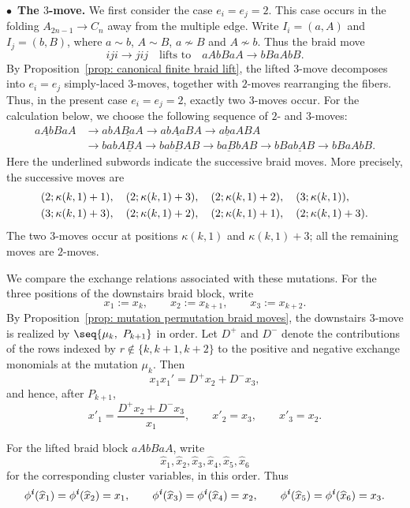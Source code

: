 \documentclass[12pt, leqno]{amsart}
\numberwithin{equation}{section}
\theoremstyle{plain}
\theoremstyle{definition}
\newcommand{\seteq}{\mathbin{:=}}
\newcommand{\ii}{ \textbf{\textit{i}}}
\newcommand{\hx}{\widehat{x}}
\begin{document}
\smallskip
\noindent
$\bullet$\ \textbf{The $3$-move.}
We first consider the case $e_i=e_j=2$.  This case occurs in the folding
$A_{2n-1}\to C_n$ away from the multiple edge.
Write $I_i=(a,A)$ and $I_j=(b,B)$, where $a\sim b$, $A\sim B$, $a\nsim B$ and $A\nsim b$.
Thus the braid move
\[
iji\longrightarrow jij \quad \text{lifts to} \quad  aAbBaA\longrightarrow bBaAbB.
\]
By Proposition~\ref{prop: canonical finite braid lift}, the lifted
$3$-move decomposes into $e_i=e_j$ simply-laced $3$-moves, together
with $2$-moves rearranging the fibers.  Thus, in the present case
$e_i=e_j=2$, exactly two $3$-moves occur.
For the calculation below, we choose the following  sequence of $2$- and $3$-moves:{}
\begin{equation} \label{eq: seq of lifted 3-move 2,2}
\begin{aligned}
a\underline{Ab}BaA
&\longrightarrow abA\underline{Ba}A
 \longrightarrow ab\underline{Aa}BA
 \longrightarrow \underline{aba}ABA\\
&\longrightarrow bab\underline{ABA}
 \longrightarrow ba\underline{bB}AB
 \longrightarrow b\underline{aB}bAB
 \longrightarrow bBa\underline{bA}B
 \longrightarrow bBaAbB.
\end{aligned}
\end{equation}
Here the underlined subwords indicate the successive braid moves.
More precisely, the successive moves are
\begin{align*}
 &(2;\kappa(k,1)+1),\quad (2;\kappa(k,1)+3),\quad (2;\kappa(k,1)+2),\quad (3;\kappa(k,1)),\allowdisplaybreaks\\
 &(3;\kappa(k,1)+3),\quad (2;\kappa(k,1)+2),\quad (2;\kappa(k,1)+1),\quad (2;\kappa(k,1)+3).
\end{align*}
The two $3$-moves occur at positions $\kappa(k,1)$ and $\kappa(k,1)+3$; all the
remaining moves are $2$-moves.

We compare the exchange relations associated with these mutations.
For the three positions of the downstairs braid block, write
\[
x_1 \seteq x_k,\qquad x_2 \seteq x_{k+1},\qquad x_3 \seteq x_{k+2}.
\]
By Proposition~\ref{prop: mutation permutation braid moves}, the
downstairs $3$-move is realized by $\seq{\mu_k,\ P_{k+1}}$ in order.
 Let $D^+$ and $D^-$ denote the contributions of the rows indexed by
$r\notin\{k,k+1,k+2\}$ to the positive and negative exchange monomials
at the mutation $\mu_k$.  Then
\[
x_1x_1'=D^+x_2+D^-x_3,
\]
and hence, after $P_{k+1}$,
\[
x'_1=\frac{D^+x_2+D^-x_3}{x_1},   \qquad   x'_2=x_3,   \qquad   x'_3=x_2.
\]

  For the lifted braid block $aAbBaA$, write 
\[
\hx_1,\hx_2,\hx_3,\hx_4,\hx_5,\hx_6
\]
for the corresponding cluster variables, in this order. Thus
\[
\phi^\ii(\hx_1)=\phi^\ii(\hx_2)=x_1,\qquad \phi^\ii(\hx_3)=\phi^\ii(\hx_4)=x_2,\qquad \phi^\ii(\hx_5)=\phi^\ii(\hx_6)=x_3.
\]
\end{document}
